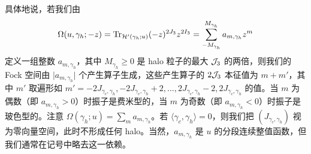 具体地说，若我们由
\begin{equation}
\Omega(u,\gamma_h;-z) =  {\rm Tr}_{\mathcal{H}'(\gamma_h;u)}(-z)^{2J_3} z^{2 I_3} =
\sum_{-M_{\gamma_h}}^{M_{\gamma_h}} a_{m, \gamma_h} z^m
\end{equation}
定义一组整数 $a_{m, \gamma_h}$，其中 $M_{\gamma_h} \ge 0$ 是 halo 粒子的最大 $\mathcal{J}_3$ 的两倍，则我们的 Fock 空间由 $\vert a_{m,\gamma_h}\vert$ 个产生算子生成，这些产生算子的 $2 \mathcal{J}_3$ 本征值为 $m+m'$，其中 $m'$ 取遍形如 $m' = -2J_{\gamma_c,\gamma_h}, -2J_{\gamma_c,\gamma_h} + 2, \dots,2J_{\gamma_c,\gamma_h}-2, 2J_{\gamma_c,\gamma_h}$ 的值。当 $m$ 为偶数（即 $a_{m,\gamma_h}>0$）时振子是费米型的，当 $m$ 为奇数（即 $a_{m,\gamma_h}<0$）时振子是玻色型的。注意 $\Omega(\gamma_h;u) = \sum_m a_{m, \gamma_h}$。若 $\langle\gamma_c,\gamma_h \rangle=0$，则我们把 $(J_{\gamma_c,\gamma_h})$ 视为零向量空间，此时不形成任何 halo。当然，$a_{m, \gamma_h}$ 是 $u$ 的分段连续整值函数，但我们通常在记号中略去这一依赖。
